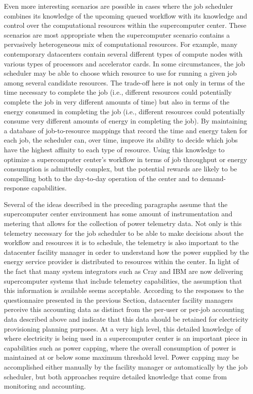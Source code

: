 Even more interesting scenarios are possible in cases where the job
scheduler combines its knowledge of the upcoming queued workflow with
its knowledge and control over the computational resources within
the supercomputer center.  These scenarios are most appropriate when
the supercomputer scenario contains a pervasively heterogeneous mix
of computational resources.  For example, many contemporary datacenters
contain several different types of compute nodes with various types of
processors and accelerator cards.  In some circumstances, the job
scheduler may be able to choose which resource to use for running a
given job among several candidate resources.  The trade-off here is
not only in terms of the time necessary to complete the job (i.e.,
different resources could potentially complete the job in very different
amounts of time) but also in terms of the energy consumed in completing
the job (i.e., different resources could potentially consume very
different amounts of energy in completing the job).  By maintaining a
database of job-to-resource mappings that record the time and energy
taken for each job, the scheduler can, over time, improve its ability
to decide which jobs have the highest affinity to each type of resource.
Using this knowledge to optimize a supercomputer center's workflow in
terms of job throughput or energy consumption is admittedly complex,
but the potential rewards are likely to be compelling both to the
day-to-day operation of the center and to demand-response capabilities.


Several of the ideas described in the preceding paragraphs assume
that the supercomputer center environment has some amount of
instrumentation and metering that allows for the collection of power
telemetry data.  Not only is this telemetry necessary for the job
scheduler to be able to make decisions about the workflow and
resources it is to schedule, the telemetry is also important to the
datacenter facility manager in order to understand how the power
supplied by the energy service provider is distributed to resources
within the center.  In light of the fact that many system integrators
such as Cray and IBM are now delivering supercomputer systems that
include telemetry capabilities, the assumption that this information
is available seems acceptable.  According to the responses to the
questionnaire presented in the previous Section, datacenter facility
managers perceive this accounting data as distinct from the per-user
or per-job accounting data described above and indicate that this
data should be retained for electricity provisioning planning purposes.
At a very high level, this detailed knowledge of where electricity is
being used in a supercomputer center is an important piece in
capabilities such as power capping, where the overall consumption of
power is maintained at or below some maximum threshold level.  Power
capping may be accomplished either manually by the facility manager
or automatically by the job scheduler, but both approaches require
detailed knowledge that come from monitoring and accounting.

